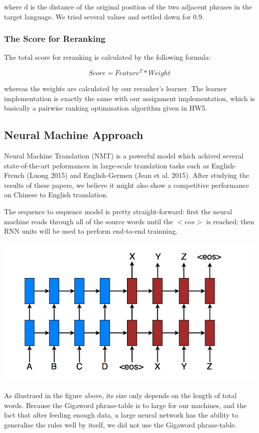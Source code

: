 \documentclass[11pt,letterpaper]{article}
\begin{document}
where d is the distance of the original position of the two adjacent phrases in the target language. We tried several values and settled down for 0.9.

\subsubsection{The Score for Reranking}

The total score for reranking is calculated by the following formula:

$$Score=Feature^T * Weight$$

whereas the weights are calculated by our reranker’s learner. The learner implementation is exactly the same with our assignment implementation, which is basically a pairwise ranking optimisation algorithm given in HW5.

\subsection{Neural Machine Approach}
\label{ssec:first}

Neural Machine Translation (NMT) is a powerful model which achived several state-of-the-art peformances in large-scale translation tasks such as English-French (Luong 2015) and English-Germen (Jean et al. 2015). After studying the results of these papers, we believe it might also show a competitive performance on Chinese to English translation.

The sequence to sequence model is pretty straight-forward:  first the neural machine reads through all of the source words until the $<eos>$ is reached; then RNN units will be used to perform end-to-end trainning.

\includegraphics[width=\columnwidth]{seq2seq.png}

As illustraed in the figure above, its size only depends on the length of total words. Because the Gigaword phrase-table is to large for our machines, and the fact that after feeding enough data, a large neural network has the ability to generalise the rules well by itself, we did not use the Gigaword phrase-table.
\end{document}
